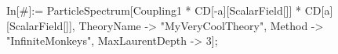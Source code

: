 In[#]:= ParticleSpectrum[Coupling1 * CD[-a][ScalarField[]] * CD[a][ScalarField[]], TheoryName -> "MyVeryCoolTheory", Method -> "InfiniteMonkeys", MaxLaurentDepth -> 3]; 